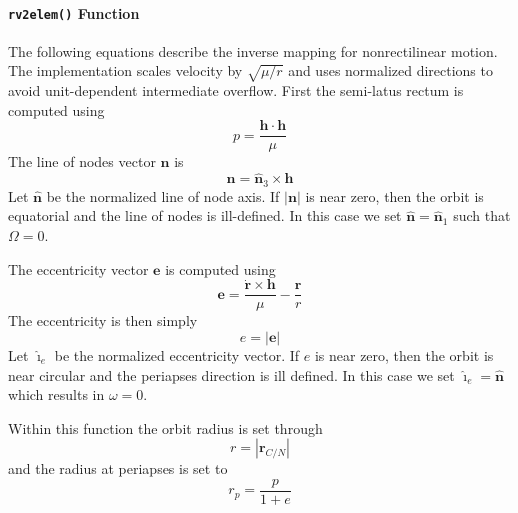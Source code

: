 \paragraph{{\tt rv2elem()} Function}
The following equations describe the inverse mapping for nonrectilinear motion. The implementation scales velocity by $\sqrt{\mu/r}$ and uses normalized directions to avoid unit-dependent intermediate overflow. First the semi-latus rectum is computed using
\begin{equation}
	p = \frac{\bm h \cdot \bm h}{\mu}
\end{equation}
The line of nodes vector $\bm n$ is
\begin{equation}
	\bm n = \hat{\bm n}_{3} \times \bm h
\end{equation}
Let $\hat{\bm n}$ be the normalized line of node axis.
If $|\bm n|$ is near zero, then the orbit is equatorial and the line of nodes is ill-defined. In this case we set $\hat{\bm n} = \hat{\bm n}_{1}$ such that $\Omega = 0$.

The eccentricity vector $\bm e$ is computed using\cite{schaub}
\begin{equation}
	\bm e = \frac{\dot{\bm r} \times \bm h}{\mu} - \frac{\bm r}{r}
\end{equation}
The eccentricity is then simply
\begin{equation}
	e = |\bm e|
\end{equation}
Let $\hat{\bm\imath}_{e}$ be the normalized eccentricity vector.
If $e$ is near zero, then the orbit is near circular and the periapses direction is ill defined.  In this case we set $\hat{\bm\imath}_{e} = \hat{\bm n}$ which results in $\omega = 0$.

Within this function the orbit radius is set through
\begin{equation}
	r = |\bm r_{C/N}|
\end{equation}
and the radius at periapses is set to
\begin{equation}
	r_{p} = \frac{p}{1 + e}
\end{equation}

